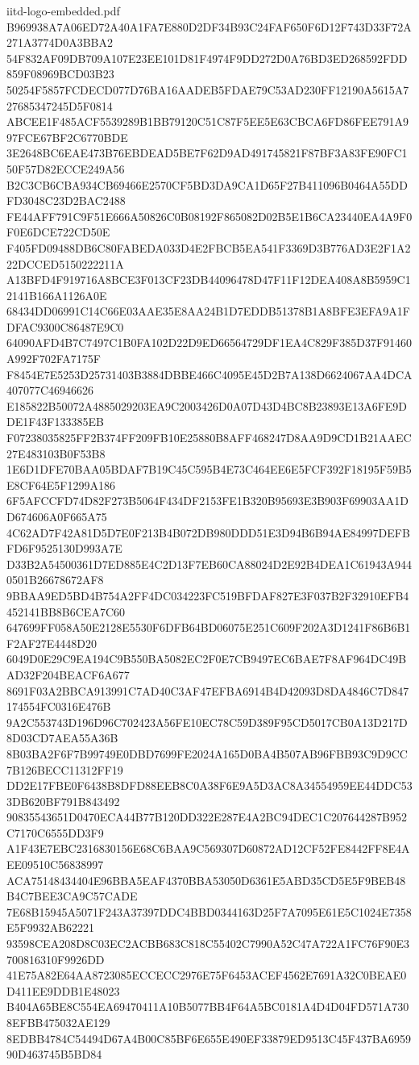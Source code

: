 \begin{filecontents*}[overwrite]{iitd-logo-embedded.pdf}
B969938A7A06ED72A40A1FA7E880D2DF34B93C24FAF650F6D12F743D33F72A271A3774D0A3BBA2
54F832AF09DB709A107E23EE101D81F4974F9DD272D0A76BD3ED268592FDD859F08969BCD03B23
50254F5857FCDECD077D76BA16AADEB5FDAE79C53AD230FF12190A5615A727685347245D5F0814
ABCEE1F485ACF5539289B1BB79120C51C87F5EE5E63CBCA6FD86FEE791A997FCE67BF2C6770BDE
3E2648BC6EAE473B76EBDEAD5BE7F62D9AD491745821F87BF3A83FE90FC150F57D82ECCE249A56
B2C3CB6CBA934CB69466E2570CF5BD3DA9CA1D65F27B411096B0464A55DDFD3048C23D2BAC2488
FE44AFF791C9F51E666A50826C0B08192F865082D02B5E1B6CA23440EA4A9F0F0E6DCE722CD50E
F405FD09488DB6C80FABEDA033D4E2FBCB5EA541F3369D3B776AD3E2F1A222DCCED5150222211A
A13BFD4F919716A8BCE3F013CF23DB44096478D47F11F12DEA408A8B5959C12141B166A1126A0E
68434DD06991C14C66E03AAE35E8AA24B1D7EDDB51378B1A8BFE3EFA9A1FDFAC9300C86487E9C0
64090AFD4B7C7497C1B0FA102D22D9ED66564729DF1EA4C829F385D37F91460A992F702FA7175F
F8454E7E5253D25731403B3884DBBE466C4095E45D2B7A138D6624067AA4DCA407077C46946626
E185822B50072A4885029203EA9C2003426D0A07D43D4BC8B23893E13A6FE9DDE1F43F133385EB
F07238035825FF2B374FF209FB10E25880B8AFF468247D8AA9D9CD1B21AAEC27E483103B0F53B8
1E6D1DFE70BAA05BDAF7B19C45C595B4E73C464EE6E5FCF392F18195F59B5E8CF64E5F1299A186
6F5AFCCFD74D82F273B5064F434DF2153FE1B320B95693E3B903F69903AA1DD674606A0F665A75
4C62AD7F42A81D5D7E0F213B4B072DB980DDD51E3D94B6B94AE84997DEFBFD6F9525130D993A7E
D33B2A54500361D7ED885E4C2D13F7EB60CA88024D2E92B4DEA1C61943A9440501B26678672AF8
9BBAA9ED5BD4B754A2FF4DC034223FC519BFDAF827E3F037B2F32910EFB4452141BB8B6CEA7C60
647699FF058A50E2128E5530F6DFB64BD06075E251C609F202A3D1241F86B6B1F2AF27E4448D20
6049D0E29C9EA194C9B550BA5082EC2F0E7CB9497EC6BAE7F8AF964DC49BAD32F204BEACF6A677
8691F03A2BBCA913991C7AD40C3AF47EFBA6914B4D42093D8DA4846C7D847174554FC0316E476B
9A2C553743D196D96C702423A56FE10EC78C59D389F95CD5017CB0A13D217D8D03CD7AEA55A36B
8B03BA2F6F7B99749E0DBD7699FE2024A165D0BA4B507AB96FBB93C9D9CC7B126BECC11312FF19
DD2E17FBE0F6438B8DFD88EEB8C0A38F6E9A5D3AC8A34554959EE44DDC533DB620BF791B843492
90835543651D0470ECA44B77B120DD322E287E4A2BC94DEC1C207644287B952C7170C6555DD3F9
A1F43E7EBC2316830156E68C6BAA9C569307D60872AD12CF52FE8442FF8E4AEE09510C56838997
ACA75148434404E96BBA5EAF4370BBA53050D6361E5ABD35CD5E5F9BEB48B4C7BEE3CA9C57CADE
7E68B15945A5071F243A37397DDC4BBD0344163D25F7A7095E61E5C1024E7358E5F9932AB62221
93598CEA208D8C03EC2ACBB683C818C55402C7990A52C47A722A1FC76F90E3700816310F9926DD
41E75A82E64AA8723085ECCECC2976E75F6453ACEF4562E7691A32C0BEAE0D411EE9DDB1E48023
B404A65BE8C554EA69470411A10B5077BB4F64A5BC0181A4D4D04FD571A7308EFBB475032AE129
8EDBB4784C54494D67A4B00C85BF6E655E490EF33879ED9513C45F437BA695990D463745B5BD84

\end{filecontents*}
